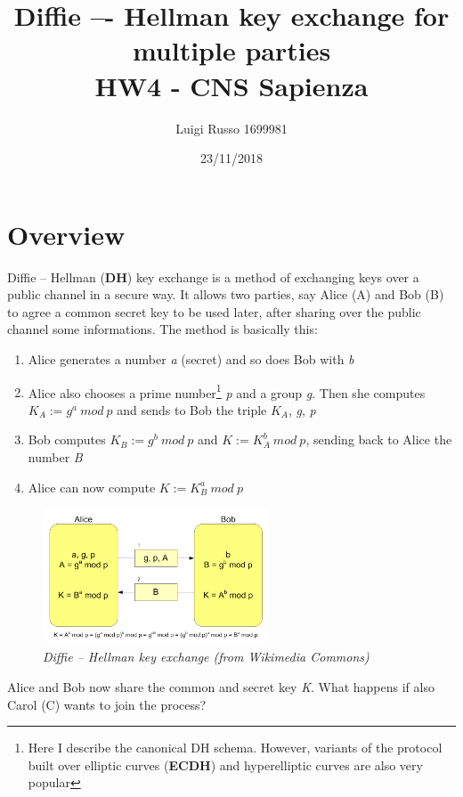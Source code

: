 \documentclass[11 pt]{article}
\title{
	Diffie –- Hellman key exchange for multiple parties \\
	\large HW4 - CNS Sapienza}
\author{Luigi Russo 1699981}
\date{23/11/2018}
\begin{document}
\maketitle

\section{Overview}
Diffie -- Hellman (\textbf{DH}) key exchange is a method of exchanging keys over a public channel in a secure way. It allows two parties, say Alice (A) and Bob (B) to agree a common secret key to be used later, after sharing over the public channel some informations. The method is basically this:
\begin{enumerate}
	\item Alice generates a number \textit{a} (secret) and so does Bob with \textit{b}
	\item Alice also chooses a prime number\footnote{Here I describe the canonical DH schema. However, variants of the protocol built over elliptic curves (\textbf{ECDH}) and hyperelliptic curves are also very popular} \textit{p} and a group \textit{g}. Then she computes $K_A := g^a\:mod\:p$ and sends to Bob the triple \textit{$K_A$}, \textit{g}, \textit{p}
	\item Bob computes $K_B:=g^b\:mod\:p$ and $K:= K_A^b\:mod\:p$, sending back to Alice the number \textit{B}
	\item Alice can now compute $K:= K_B^a\:mod\:p$
\end{enumerate}

\begin{figure}[!ht]
	\centering %
	\includegraphics[width=0.6\textwidth]{2dh-hw4-1699981.png} %
	\caption{\textit{Diffie -- Hellman key exchange (from Wikimedia Commons)}} %
	\label{fig:2dh}
\end{figure}

Alice and Bob now share the common and secret key \textit{K}. What happens if also Carol (C) wants to join the process?
\end{document}
